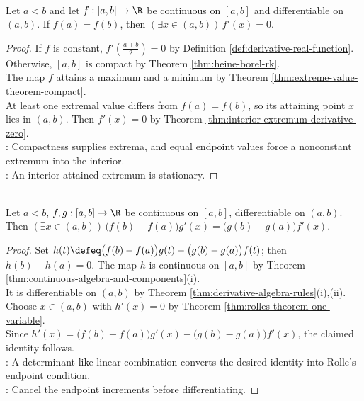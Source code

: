 \begin{theorem} \label{thm:rolles-theorem-one-variable} \\
Let $a<b$ and let $f:[a,b]\to\R$ be continuous on $[a,b]$ and differentiable on $(a,b)$. If $f(a)=f(b)$, then $(\exists x\in(a,b))\,f'(x)=0$.
\begin{proof}
If $f$ is constant, $f'(\frac{a+b}{2})=0$ by Definition \ref{def:derivative-real-function}. Otherwise, $[a,b]$ is compact by Theorem \ref{thm:heine-borel-rk}.\\
The map $f$ attains a maximum and a minimum by Theorem \ref{thm:extreme-value-theorem-compact}.\\
At least one extremal value differs from $f(a)=f(b)$, so its attaining point $x$ lies in $(a,b)$. Then $f'(x)=0$ by Theorem \ref{thm:interior-extremum-derivative-zero}.\\
: Compactness supplies extrema, and equal endpoint values force a nonconstant extremum into the interior.\\
: An interior attained extremum is stationary.
\end{proof}
\end{theorem}

\begin{theorem} \label{thm:cauchy-mean-value-theorem} \\
Let $a<b$, $f,g:[a,b]\to\R$ be continuous on $[a,b]$, differentiable on $(a,b)$. Then $(\exists x\in(a,b))\,\bigl(f(b)-f(a)\bigr)g'(x)=\bigl(g(b)-g(a)\bigr)f'(x)$.
\begin{proof}
Set $h(t)\defeq\bigl(f(b)-f(a)\bigr)g(t)-\bigl(g(b)-g(a)\bigr)f(t)$; then $h(b)-h(a)=0$. The map $h$ is continuous on $[a,b]$ by Theorem \ref{thm:continuous-algebra-and-components}(i).\\
It is differentiable on $(a,b)$ by Theorem \ref{thm:derivative-algebra-rules}(i),(ii). Choose $x\in(a,b)$ with $h'(x)=0$ by Theorem \ref{thm:rolles-theorem-one-variable}.\\
Since $h'(x)=\bigl(f(b)-f(a)\bigr)g'(x)-\bigl(g(b)-g(a)\bigr)f'(x)$, the claimed identity follows.\\
: A determinant-like linear combination converts the desired identity into Rolle's endpoint condition.\\
: Cancel the endpoint increments before differentiating.
\end{proof}
\end{theorem}

